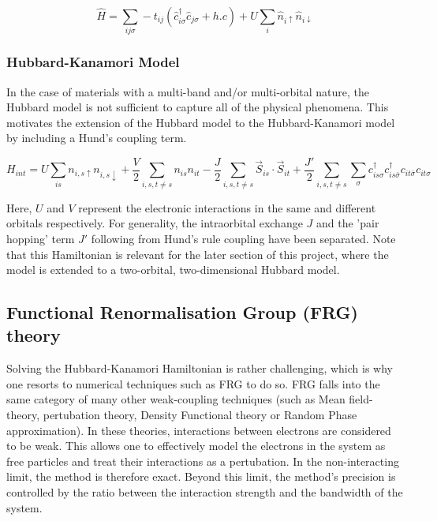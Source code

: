 \documentclass[12pt]{article}
\begin{document}
\begin{equation}\label{t Hubbard model}
    \hat{H} = \sum_{ij\sigma} -t_{ij}(\hat{c}_{i\sigma}^{\dagger}\hat{c}_{j \sigma} + h.c) 
    + U \sum_{i} \hat{n}_{i \uparrow} \hat{n}_{i \downarrow}
\end{equation}





\subsubsection{Hubbard-Kanamori Model}
\label{subsubsec: HKmodel}
In the case of materials with a multi-band and/or multi-orbital nature, the Hubbard model is not sufficient to capture all of the physical phenomena. This motivates the extension of the Hubbard model to the Hubbard-Kanamori model\cite{sherman2020hubbard} by including a Hund's coupling term.

\begin{equation} \label{Hubbard-Kanamori Model}
    H_{int} = U \sum_{is}n_{i,s\uparrow}n_{i,s\downarrow} + \frac{V}{2} \sum_{i,s,t \neq s} n_{is}n_{it} -\frac{J}{2} \sum_{i,s,t \neq s} \vec{S}_{is} \cdot \vec{S}_{it} 
    + \frac{J'}{2} \sum_{i,s,t \neq s} \sum_{\sigma} c_{is\sigma}^{\dagger}c_{is\bar{\sigma}}^{\dagger}c_{it\bar{\sigma}}c_{it\sigma}
\end{equation}

\noindent Here, $U$ and $V$ represent the electronic interactions in the same and different orbitals respectively. For generality, the intraorbital exchange $J$ and the 'pair hopping' term $J'$ following from Hund's rule coupling have been separated.  
Note that this Hamiltonian is relevant for the later section of this project, where the model is extended to a two-orbital, two-dimensional Hubbard model.

\subsection{Functional Renormalisation Group (FRG) theory}

Solving the Hubbard-Kanamori Hamiltonian is rather challenging, which is why one resorts to numerical techniques such as FRG to do so. FRG falls into the same category of many other weak-coupling techniques (such as Mean field-theory\cite{kadanoff2009more}, pertubation theory\cite{nagaosa2013quantum}, Density Functional theory\cite{kohn1965self} or Random Phase approximation\cite{bohm1951collective}).
In these theories, interactions between electrons are considered to be weak. This allows one to effectively model the electrons in the system as free particles 
and treat their interactions as a pertubation. In the non-interacting limit, the method is therefore exact. Beyond this limit, the method's precision is controlled by the ratio between the interaction
strength and the bandwidth of the system. 
\end{document}
